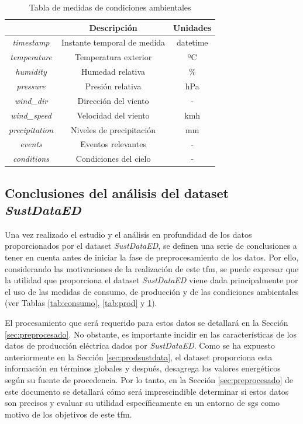 \begin{table}[h!]
    \centering
    \begin{tabular}{|c|c|c|}
    \hline
    \rowcolor[HTML]{AAAAAA} 
    \multicolumn{1}{|c|}{\cellcolor[HTML]{AAAAAA}Campo} & \multicolumn{1}{c|}{\cellcolor[HTML]{AAAAAA}Descripción} & Unidades \\ \hline
    \textit{timestamp} & Instante temporal de medida & datetime \\ \hline
    \textit{temperature} & Temperatura exterior & ºC \\ \hline
    \textit{humidity} & Humedad relativa & \% \\ \hline
    \textit{pressure} & Presión relativa & hPa \\ \hline
    \textit{wind\_dir} & Dirección del viento & - \\ \hline
    \textit{wind\_speed} & Velocidad del viento & kmh \\ \hline
    \textit{precipitation} & Niveles de precipitación & mm \\ \hline
    \textit{events} & Eventos relevantes & - \\ \hline
    \textit{conditions} & Condiciones del cielo & - \\ \hline
    \end{tabular}
    \caption{Tabla de medidas de condiciones ambientales \cite{sustdata}}
    \label{tab:env}
\end{table}

\subsection{Conclusiones del análisis del dataset \textit{SustDataED}}
\label{sec:conclusionessustdata}

Una vez realizado el estudio y el análisis en profundidad de los datos proporcionados por el dataset \textit{SustDataED}, se definen una serie de conclusiones a tener en cuenta antes de iniciar la fase de preprocesamiento de los datos. Por ello, considerando las motivaciones de la realización de este \gls{tfm}, se puede expresar que la utilidad que proporciona el dataset \textit{SustDataED} viene dada principalmente por el uso de las medidas de consumo, de producción y de las condiciones ambientales (ver Tablas \ref{tab:consumo}, \ref{tab:prod} y \ref{tab:env}). 

\vspace{3mm}

El procesamiento que será requerido para estos datos se detallará en la Sección \ref{sec:preprocesado}. No obstante, es importante incidir en las características de los datos de producción eléctrica dados por \textit{SustDataED}. Como se ha expuesto anteriormente en la Sección \ref{sec:prodsustdata}, el dataset proporciona esta información en términos globales y después, desagrega los valores energéticos según su fuente de procedencia. Por lo tanto, en la Sección \ref{sec:preprocesado} de este documento se detallará cómo será imprescindible determinar si estos datos son precisos y evaluar su utilidad específicamente en un entorno de \gls{sg}s como motivo de los objetivos de este \gls{tfm}.


